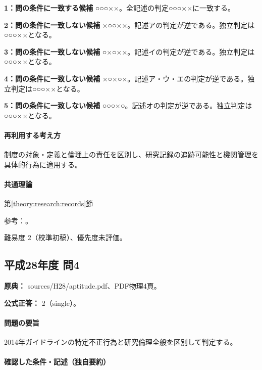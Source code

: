 \noindent\textbf{1：問の条件に一致する候補} ○○○××。全記述の判定○○○××に一致する。\par

\noindent\textbf{2：問の条件に一致しない候補} ×○○××。記述アの判定が逆である。独立判定は○○○××となる。\par

\noindent\textbf{3：問の条件に一致しない候補} ○×○××。記述イの判定が逆である。独立判定は○○○××となる。\par

\noindent\textbf{4：問の条件に一致しない候補} ×○×○×。記述ア・ウ・エの判定が逆である。独立判定は○○○××となる。\par

\noindent\textbf{5：問の条件に一致しない候補} ○○○×○。記述オの判定が逆である。独立判定は○○○××となる。\par

\paragraph{再利用する考え方} 制度の対象・定義と倫理上の責任を区別し、研究記録の追跡可能性と機関管理を具体的行為に適用する。

\paragraph{共通理論} \hyperref[theory:research:records]{第\ref*{theory:research:records}節}

\par 参考：\cite{mext_misconduct2014,jsps_integrity2025}。

\par 難易度 2（校準初稿）、優先度未評価。

\subsection{平成28年度 問4}
\label{q:h28-reg-apt-04}

\noindent\textbf{原典：} sources/H28/aptitude.pdf、PDF物理4頁。

\textbf{公式正答：} 2（single）。

\paragraph{問題の要旨} 2014年ガイドラインの特定不正行為と研究倫理全般を区別して判定する。

\paragraph{確認した条件・記述（独自要約）}\mbox{}\par

